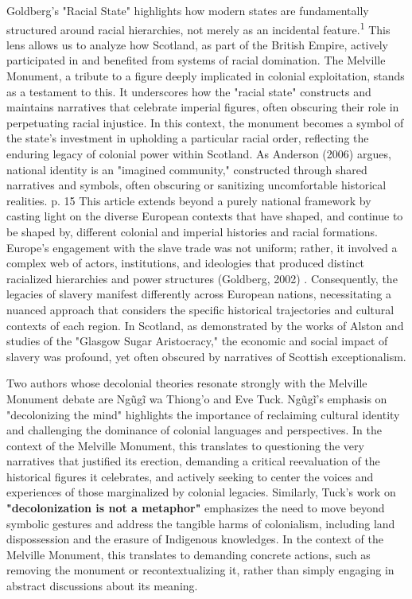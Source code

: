 \documentclass{scrartcl}
\begin{document}
Goldberg's "Racial State" highlights how modern states are fundamentally structured around racial hierarchies, not merely as an incidental feature.\textsuperscript{1} This lens allows us to analyze how Scotland, as part of the British Empire, actively participated in and benefited from systems of racial domination. The Melville Monument, a tribute to a figure deeply implicated in colonial exploitation, stands as a testament to this. It underscores how the "racial state" constructs and maintains narratives that celebrate imperial figures, often obscuring their role in perpetuating racial injustice. In this context, the monument becomes a symbol of the state's investment in upholding a particular racial order, reflecting the enduring legacy of colonial power within Scotland.
As Anderson (2006) argues, national identity is an "imagined community," constructed through shared narratives and symbols, often obscuring or sanitizing uncomfortable historical realities. \cite{anderson_2020}{p. 15}
This article extends beyond a purely national framework by casting light on the diverse European contexts that have shaped, and continue to be shaped by, different colonial and imperial histories and racial formations.
Europe's engagement with the slave trade was not uniform; rather, it involved a complex web of actors, institutions, and ideologies that produced distinct racialized hierarchies and power structures (Goldberg, 2002) \cite{goldberg_2002}.
Consequently, the legacies of slavery manifest differently across European nations, necessitating a nuanced approach that considers the specific historical trajectories and cultural contexts of each region.
In Scotland, as demonstrated by the works of Alston \cite{alston_2021} and studies of the "Glasgow Sugar Aristocracy," the economic and social impact of slavery was profound, yet often obscured by narratives of Scottish exceptionalism.

Two authors whose decolonial theories resonate strongly with the Melville Monument debate are Ngũgĩ wa Thiong'o and Eve Tuck. Ngũgĩ's emphasis on "decolonizing the mind" highlights the importance of reclaiming cultural identity and challenging the dominance of colonial languages and perspectives.
In the context of the Melville Monument, this translates to questioning the very narratives that justified its erection, demanding a critical reevaluation of the historical figures it celebrates, and actively seeking to center the voices and experiences of those marginalized by colonial legacies. Similarly, Tuck's work on \textbf{"decolonization is not a metaphor"} emphasizes the need to move beyond symbolic gestures and address the tangible harms of colonialism, including land dispossession and the erasure of Indigenous knowledges. In the context of the Melville Monument, this translates to demanding concrete actions, such as removing the monument or recontextualizing it, rather than simply engaging in abstract discussions about its meaning. 
\end{document}
